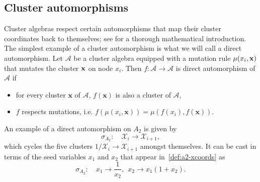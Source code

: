 \documentclass[11pt]{article}
\def\x{\mathcal{X}}
\def\a{\mathcal{A}}
\begin{document}

\subsection{Cluster automorphisms}\label{sec:automorphisms}

Cluster algebras respect certain automorphisms that map their cluster coordinates back to themselves; see \cite{Chang:2015} for a thorough mathematical introduction. The simplest example of a cluster automorphism is what we will call a direct automorphism. Let $\a$ be a cluster algebra equipped with a mutation rule $\mu(x_i, \bf{x})$ that mutates the cluster $\bf{x}$ on node $x_i$. Then $f: \a \to \a$ is direct automorphism of $\a$ if
\begin{itemize}
  \item for every cluster $\mathbf{x}$ of $\a$, $f(\mathbf{x})$ is also a cluster of $\a$,
  \item $f$ respects mutations, i.e. $f(\mu(x_i,\mathbf{x})) = \mu(f(x_i),f(\mathbf{x}))$.
 \end{itemize} 
An example of a direct automorphism on $A_2$ is given by
\begin{equation}
  \sigma_{A_2}:\quad \mathcal{X}_i \to \mathcal{X}_{i+1},
\end{equation}
which cycles the five clusters $1/\x_i\to \x_{i+1}$ amongst themselves. It can be cast in terms of the seed variables $x_1$ and $x_2$ that appear in~\eqref{def:a2-xcoords} as 
\begin{equation}
  \sigma_{A_2}:\quad x_1\to \frac{1}{x_2},~~ x_2\to x_1(1+x_2).
\end{equation}
\end{document}
